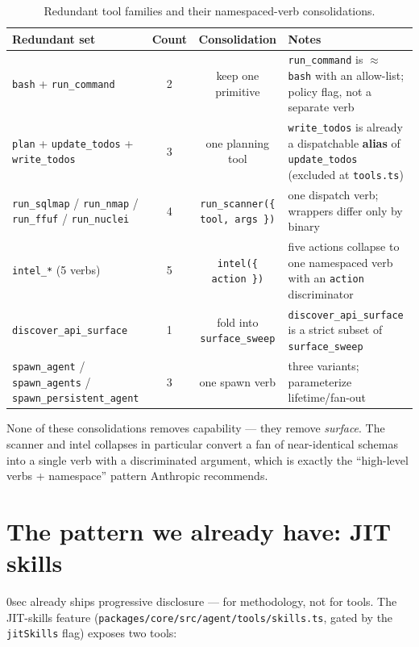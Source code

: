 \documentclass[11pt]{article}
\begin{document}
\begin{table}[ht]
\centering
\small
\begin{tabular}{lccl}
\toprule
Redundant set & Count & Consolidation & Notes \\
\midrule
\texttt{bash} + \texttt{run\_command} & 2 & keep one primitive & \texttt{run\_command} is $\approx$ \texttt{bash} with an allow-list; policy flag, not a separate verb \\
\texttt{plan} + \texttt{update\_todos} + \texttt{write\_todos} & 3 & one planning tool & \texttt{write\_todos} is already a dispatchable \textbf{alias} of \texttt{update\_todos} (excluded at \texttt{tools.ts}) \\
\texttt{run\_sqlmap} / \texttt{run\_nmap} / \texttt{run\_ffuf} / \texttt{run\_nuclei} & 4 & \texttt{run\_scanner(\{ tool, args \})} & one dispatch verb; wrappers differ only by binary \\
\texttt{intel\_*} (5 verbs) & 5 & \texttt{intel(\{ action \})} & five actions collapse to one namespaced verb with an \texttt{action} discriminator \\
\texttt{discover\_api\_surface} & 1 & fold into \texttt{surface\_sweep} & \texttt{discover\_api\_surface} is a strict subset of \texttt{surface\_sweep} \\
\texttt{spawn\_agent} / \texttt{spawn\_agents} / \texttt{spawn\_persistent\_agent} & 3 & one spawn verb & three variants; parameterize lifetime/fan-out \\
\bottomrule
\end{tabular}
\caption{Redundant tool families and their namespaced-verb consolidations.}
\label{tab:redundancy}
\end{table}

None of these consolidations removes capability --- they remove \textit{surface}.
The scanner and intel collapses in particular convert a fan of near-identical
schemas into a single verb with a discriminated argument, which is exactly the
``high-level verbs + namespace'' pattern Anthropic recommends.

\section{The pattern we already have: JIT skills}

0sec already ships progressive disclosure --- for methodology, not for tools. The
JIT-skills feature (\texttt{packages/core/src/agent/tools/skills.ts}, gated by the
\texttt{jitSkills} flag) exposes two tools:
\end{document}
